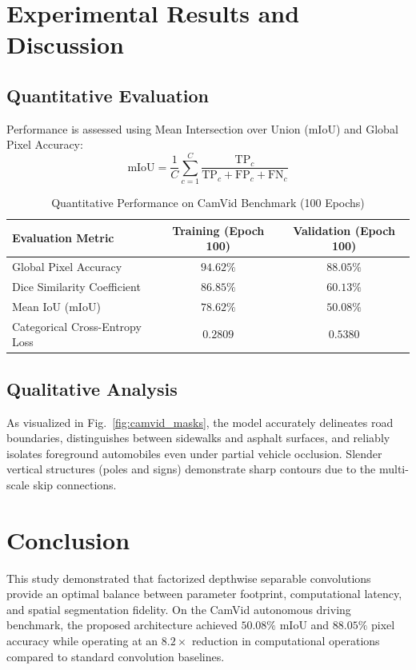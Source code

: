 \documentclass[conference]{IEEEtran}
\begin{document}
\section{Experimental Results and Discussion}

\subsection{Quantitative Evaluation}
Performance is assessed using Mean Intersection over Union (mIoU) and Global Pixel Accuracy:
\begin{equation}
\text{mIoU} = \frac{1}{C} \sum_{c=1}^C \frac{\text{TP}_c}{\text{TP}_c + \text{FP}_c + \text{FN}_c}
\end{equation}

\begin{table}[htbp]
\caption{Quantitative Performance on CamVid Benchmark (100 Epochs)}
\centering
\begin{tabular}{@{}lcc@{}}
\toprule
\textbf{Evaluation Metric} & \textbf{Training (Epoch 100)} & \textbf{Validation (Epoch 100)} \\
\midrule
Global Pixel Accuracy & $94.62\%$ & $88.05\%$ \\
Dice Similarity Coefficient & $86.85\%$ & $60.13\%$ \\
Mean IoU (mIoU) & $78.62\%$ & $50.08\%$ \\
Categorical Cross-Entropy Loss & $0.2809$ & $0.5380$ \\
\bottomrule
\end{tabular}
\label{tab:camvid_benchmarks}
\end{table}

\subsection{Qualitative Analysis}
As visualized in Fig.~\ref{fig:camvid_masks}, the model accurately delineates road boundaries, distinguishes between sidewalks and asphalt surfaces, and reliably isolates foreground automobiles even under partial vehicle occlusion. Slender vertical structures (poles and signs) demonstrate sharp contours due to the multi-scale skip connections.

\section{Conclusion}
This study demonstrated that factorized depthwise separable convolutions provide an optimal balance between parameter footprint, computational latency, and spatial segmentation fidelity. On the CamVid autonomous driving benchmark, the proposed architecture achieved $50.08\%$ mIoU and $88.05\%$ pixel accuracy while operating at an $8.2\times$ reduction in computational operations compared to standard convolution baselines.
\end{document}
